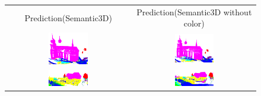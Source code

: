     \begin{figure}[h!]
        \centering
        \begin{tabular}{cc}
            Prediction(Semantic3D) & Prediction(Semantic3D without color)\\
            \includegraphics[width=0.33\textwidth, height=0.18\textheight]{images/ood_imgs/de_sem3d/de_class_prob_1.pdf}&
            \includegraphics[width=0.33\textwidth, height=0.18\textheight]{images/sem3d_of/de_sem3d_of_1.pdf}\\

            \includegraphics[width=0.33\textwidth, height=0.18\textheight]{images/ood_imgs/de_sem3d/de_class_prob_2.pdf}&
            \includegraphics[width=0.33\textwidth, height=0.18\textheight]{images/sem3d_of/de_sem3d_of_2.pdf}\\


\end{tabular}
\end{figure}
